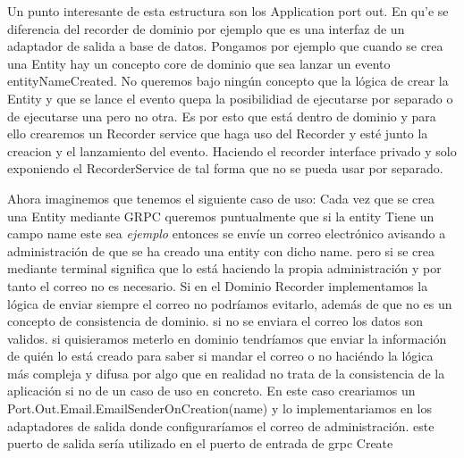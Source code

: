 Un punto interesante de esta estructura son los Application port out. En qu'e se diferencia del recorder de dominio por ejemplo que es una interfaz de un adaptador de salida a base de datos. Pongamos por ejemplo que cuando se crea una Entity hay un concepto core de dominio que sea lanzar un evento entityNameCreated. No queremos bajo ningún concepto que la lógica de crear la Entity y que se lance el evento quepa la posibilidiad de ejecutarse por separado o de ejecutarse una pero no otra. Es por esto que está dentro de dominio y para ello crearemos un Recorder service que haga uso del Recorder y esté junto la creacion y el lanzamiento del evento. Haciendo el recorder interface privado y solo exponiendo el RecorderService de tal forma que no se pueda usar por separado.

Ahora imaginemos que tenemos el siguiente caso de uso:
Cada vez que se crea una Entity mediante GRPC queremos puntualmente que si la entity Tiene un campo name este sea \textit{ejemplo} entonces se envíe un correo electrónico avisando a administración de que se ha creado una entity con dicho name.
pero si se crea mediante terminal significa que lo está haciendo la propia administración y por tanto el correo no es necesario. Si en el Dominio Recorder implementamos la lógica de enviar siempre el correo no podríamos evitarlo, además de que no es un concepto de consistencia de dominio. si no se enviara el correo los datos son validos. si quisieramos meterlo en dominio tendríamos que enviar la información de quién lo está creado para saber si mandar el correo o no haciéndo la lógica más compleja y difusa por algo que en realidad no trata de la consistencia de la aplicación si no de un caso de uso en concreto. En este caso creariamos un Port.Out.Email.EmailSenderOnCreation(name) y lo implementariamos en los adaptadores de salida donde configuraríamos el correo de administración. este puerto de salida sería utilizado en el puerto de entrada de grpc Create

\begin{figure}[H]
    
    \caption{}
    \label{fig:ProjectfolderStructurePortOut}
\end{figure}